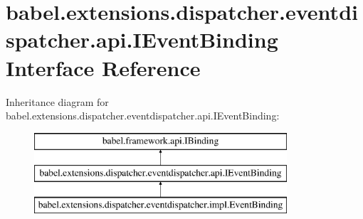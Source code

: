 \hypertarget{interfacebabel_1_1extensions_1_1dispatcher_1_1eventdispatcher_1_1api_1_1_i_event_binding}{\section{babel.\-extensions.\-dispatcher.\-eventdispatcher.\-api.\-I\-Event\-Binding Interface Reference}
\label{interfacebabel_1_1extensions_1_1dispatcher_1_1eventdispatcher_1_1api_1_1_i_event_binding}
}
Inheritance diagram for babel.\-extensions.\-dispatcher.\-eventdispatcher.\-api.\-I\-Event\-Binding\-:\begin{figure}[H]
\begin{center}
\leavevmode
\includegraphics[height=3.000000cm]{interfacebabel_1_1extensions_1_1dispatcher_1_1eventdispatcher_1_1api_1_1_i_event_binding}
\end{center}
\end{figure}
